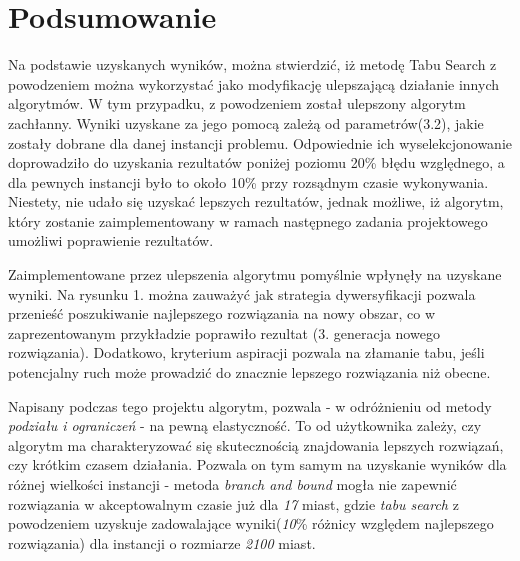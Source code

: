 \documentclass{article}
\begin{document}


\newpage	
	
\section{Podsumowanie}
\par Na podstawie uzyskanych wyników, można stwierdzić, iż metodę Tabu Search z powodzeniem można wykorzystać jako modyfikację ulepszającą działanie innych algorytmów. W tym przypadku, z powodzeniem został ulepszony algorytm zachłanny. Wyniki uzyskane za jego pomocą zależą od parametrów(3.2), jakie zostały dobrane dla danej instancji problemu. Odpowiednie ich wyselekcjonowanie doprowadziło do uzyskania rezultatów poniżej poziomu 20\% błędu względnego, a dla pewnych instancji było to około 10\% przy rozsądnym czasie wykonywania. Niestety, nie udało się uzyskać lepszych rezultatów, jednak możliwe, iż algorytm, który zostanie zaimplementowany w ramach następnego zadania projektowego umożliwi poprawienie rezultatów.
\\ \par Zaimplementowane przez ulepszenia algorytmu pomyślnie wpłynęły na uzyskane wyniki. Na rysunku 1. można zauważyć jak strategia dywersyfikacji pozwala przenieść poszukiwanie najlepszego rozwiązania na nowy obszar, co w zaprezentowanym przykładzie poprawiło rezultat (3. generacja nowego rozwiązania). Dodatkowo, kryterium aspiracji pozwala na złamanie tabu, jeśli potencjalny ruch może prowadzić do znacznie lepszego rozwiązania niż obecne.
\\ \par Napisany podczas tego projektu algorytm, pozwala - w odróżnieniu od metody\textit{ podziału i ograniczeń} - na pewną elastyczność. To od użytkownika zależy, czy algorytm ma charakteryzować się skutecznością znajdowania lepszych rozwiązań, czy krótkim czasem działania. Pozwala on tym samym na uzyskanie wyników dla różnej wielkości instancji - metoda\textit{ branch and bound} mogła nie zapewnić rozwiązania w akceptowalnym czasie już dla \textit{17} miast, gdzie \textit{tabu search} z powodzeniem uzyskuje zadowalające wyniki(\textit{10}\% różnicy względem najlepszego rozwiązania) dla instancji o rozmiarze \textit{2100} miast.  

	
	
\end{document}
